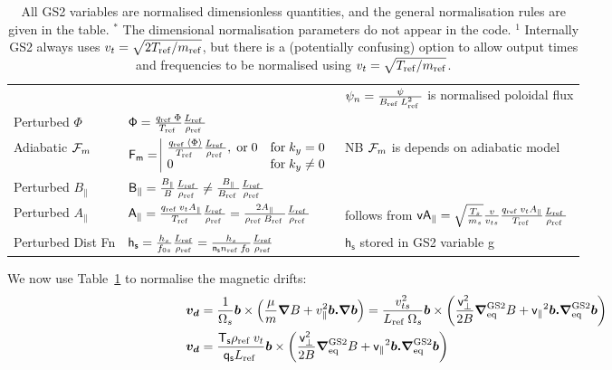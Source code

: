 \documentclass[10pt,a4paper]{article}
\newcommand{\grad}{{\bfm \nabla}}
\newcommand{\bfm}[1]{\mbox{{\boldmath $ { #1}$}}}
\newcommand{\gradeq}{\bfm{\nabla}^{\rm GS2}_{\rm eq}}
\newcommand{\n}[1]{{#1}_{\rm ref\;}}
\newcommand{\g}[1]{\mathsf{#1}}
\newcommand{\flav}[1]{\left\langle{#1}\right\rangle}
\begin{document}
\begin{table}[htb]
\begin{tabular}{|l|l|l|}
& & $\psi_n = \frac{\psi}{\n{B} \n{L}^2}$ is normalised poloidal flux\\ 
Perturbed $\Phi$ & $\g{\Phi} = \frac{\n{q} \Phi}{\n{T}} \frac{\n{L}}{\n{\rho}}$ & \\
Adiabatic ${\cal F}_m$  & $\g{F_m} = 
\begin{array}{|ll}
\frac{\n{q} \flav{\Phi}}{\n{T}} \frac{\n{L}}{\n{\rho}}, \;{\rm or}\; 0  & {\rm
  for}\; k_y=0 \\
0 & {\rm for}\; k_y \ne 0\\ \end{array}$ & NB ${\cal F}_m$ is depends on adiabatic model\\
Perturbed $B_{\parallel}$ & $\g{B_{\parallel}} =
\frac{B_{\parallel}}{B}\frac{\n{L}}{\n{\rho}}  \ne
\frac{B_{\parallel}}{\n{B}}\frac{\n{L}}{\n{\rho}}$&  \\
Perturbed $A_{\parallel}$ & $\g{A_{\parallel}} = \frac{\n{q} v_t
  A_{\parallel}}{\n{T}} \frac{\n{L}}{\n{\rho}} = \frac{2
  A_{\parallel}}{\n{\rho} \n{B}} \frac{\n{L}}{\n{\rho}}$ &  follows from $\g{v
  A_{\parallel}} = \sqrt{\frac{T_s}{m_s}} \frac{v}{v_{ts}} \frac{\n{q} v_t
  A_{\parallel}}{\n{T}} \frac{\n{L}}{\n{\rho}}$  \\
Perturbed Dist Fn & $\g{h_s} = \frac{h_s}{f_{0s}} \frac{L_{\rm ref}}{\rho_{\rm
    ref}} = \frac{h_s}{\g{n_s}\n{n} f_{0}} \frac{L_{\rm ref}}{\rho_{\rm ref}}$
& $\g{h_s}$ stored in GS2 variable g\\
\hline
\end{tabular}
\caption{\label{tab:norm} All GS2 variables are normalised dimensionless
  quantities, and the general normalisation rules are given in the table. 
  $^{\ast}$ The dimensional normalisation parameters do not appear in the code. 
  $^1$ Internally GS2 always uses $v_t = \sqrt{2T_{\rm ref}/m_{\rm ref}}$, but
  there is a (potentially confusing) option to allow output times
  and frequencies to be normalised using  $v_t = \sqrt{T_{\rm ref}/m_{\rm ref}}$.}
\end{table}
We now use Table~\ref{tab:norm} to normalise the magnetic drifts:
\begin{align*}
  \bfm{v_d} & = \frac{1}{\Omega_s} \bfm{b} \times \left( \frac{\mu}{m}
    \grad{B} + v_{\parallel}^2 \bfm{b.}\grad \bfm{b} \right) =
  \frac{v_{ts}^2}{\n{L} \Omega_s} \bfm{b} \times \left(
    \frac{\g{v_{\perp}^2}}{2B} \gradeq{B} + \g{v_{\parallel}}^2
    \bfm{b.}\gradeq \bfm{b} \right) \\
  \bfm{v_d} & = \frac{\g{T_s}\n{\rho} v_t}{\g{q_s}\n{L}} \bfm{b} \times \left(
    \frac{\g{v_{\perp}^2}}{2B} \gradeq{B} + \g{v_{\parallel}}^2
    \bfm{b.}\gradeq \bfm{b} \right)
\end{align*}
\end{document}
